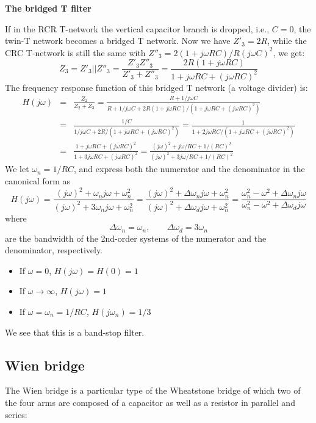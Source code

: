 {\bf The bridged T filter}

If in the RCR T-network the vertical capacitor branch is dropped, 
i.e., $C=0$, the twin-T network becomes a bridged T network. Now
we have $Z'_3=2R$, while the CRC T-network is still the same with 
$Z''_3=2(1+j\omega RC)/R(j\omega C)^2$, we get:
\[
  Z_3=Z'_3||Z''_3=\frac{Z'_3 Z''_3}{Z'_3+Z''_3}
  =\frac{2R(1+j\omega RC)}{1+j\omega RC+(j\omega RC)^2}
\]
The frequency response function of this bridged T network (a voltage 
divider) is:
\begin{eqnarray}
  H(j\omega)&=&\frac{Z_2}{Z_2+Z_3}=\frac{R+1/j\omega C}{R+1/j\omega C+2R(1+j\omega RC)/(1+j\omega RC+(j\omega RC)^2)}
  \nonumber \\
  &=&\frac{1/C}{1/j\omega C+2R/(1+j\omega RC+(j\omega RC)^2)}
  =\frac{1}{1+2j\omega RC/(1+j\omega RC+(j\omega RC)^2)}
  \nonumber \\
  &=&\frac{1+j\omega RC+(j\omega RC)^2}{1+3j\omega RC+(j\omega RC)^2}
  =\frac{(j\omega)^2+j\omega /RC+1/(RC)^2}{(j\omega)^2+3j\omega /RC+1/(RC)^2}
  \nonumber
\end{eqnarray}
We let $\omega_n=1/RC$, and express both the numerator and the
denominator in the canonical form as
\[
H(j\omega)=\frac{(j\omega)^2+\omega_n j\omega +\omega_n^2}{(j\omega)^2+3\omega_nj\omega +\omega_n^2}
=\frac{(j\omega)^2+\Delta\omega_n j\omega+\omega_n^2}{(j\omega)^2+\Delta\omega_dj\omega +\omega_n^2}
=\frac{\omega_n^2-\omega^2+\Delta\omega_n j\omega }{\omega_n^2-\omega^2+\Delta\omega_dj\omega}
\]
where 
\[
\Delta\omega_n=\omega_n,\;\;\;\;\;\;\;\Delta\omega_d=3\omega_n
\]
are the bandwidth of the 2nd-order systems of the numerator and the
denominator, respectively. 
\begin{itemize}
\item If $\omega=0$, $H(j\omega)=H(0)=1$
\item If $\omega\rightarrow \infty$, $H(j\omega)=1$
\item If $\omega=\omega_n=1/RC$, $H(j\omega_n)=1/3$
\end{itemize}
We see that this is a band-stop filter.




\subsection*{Wien bridge}

The Wien bridge is a particular type of the Wheatstone bridge of which
two of the four arms are composed of a capacitor as well as a resistor
in parallel and series:

